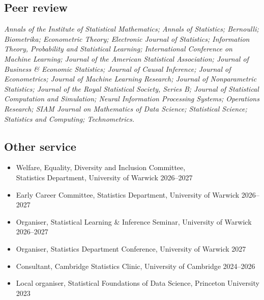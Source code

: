 \documentclass{wgu-cv}
\begin{document}
\subsection{Peer review}{}

\emph{%
  Annals of the Institute of Statistical Mathematics;
  Annals of Statistics;
  Bernoulli;
  Biometrika;
  Econometric Theory;
  Electronic Journal of Statistics;
  Information Theory, Probability and Statistical Learning;
  International Conference on Machine Learning;
  Journal of the American Statistical Association;
  Journal of Business \& Economic Statistics;
  Journal of Causal Inference;
  Journal of Econometrics;
  Journal of Machine Learning Research;
  Journal of Nonparametric Statistics;
  Journal of the Royal Statistical Society, Series B;
  Journal of Statistical Computation and Simulation;
  Neural Information Processing Systems;
  Operations Research;
  SIAM Journal on Mathematics of Data Science;
  Statistical Science;
  Statistics and Computing;
  Technometrics.
}

\subsection{Other service}{}

\begin{itemize}

  \item
    Welfare, Equality, Diversity and Inclusion Committee, \\
    Statistics Department,
    University of Warwick
    \hfill 2026--2027

  \item
    Early Career Committee,
    Statistics Department,
    University of Warwick
    \hfill 2026--2027

  \item
    Organiser, Statistical Learning \& Inference Seminar,
    University of Warwick
    \hfill 2026--2027

  \item
    Organiser, Statistics Department Conference,
    University of Warwick
    \hfill 2027

  \item
    Consultant, Cambridge Statistics Clinic,
    University of Cambridge
    \hfill 2024--2026

  \item
    Local organiser,
    Statistical Foundations of Data Science, Princeton University
    \hfill 2023

\end{itemize}
\end{document}
